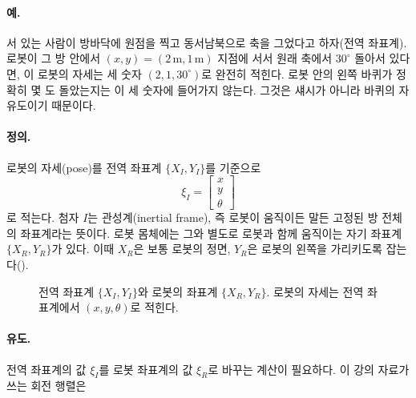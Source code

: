 \paragraph{예.} 서 있는 사람이 방바닥에 원점을 찍고 동서남북으로 축을 그었다고
하자(전역 좌표계). 로봇이 그 방 안에서 $(x,y)=(2\,\text{m}, 1\,\text{m})$
지점에 서서 원래 축에서 $30^\circ$ 돌아서 있다면, 이 로봇의 자세는 세 숫자
$(2, 1, 30^\circ)$로 완전히 적힌다. 로봇 안의 왼쪽 바퀴가 정확히 몇 도
돌았는지는 이 세 숫자에 들어가지 않는다. 그것은 섀시가 아니라 바퀴의
자유도이기 때문이다.

\paragraph{정의.} 로봇의 자세(pose)를 전역 좌표계 $\{X_I, Y_I\}$를 기준으로
\[
  \xi_I = \begin{bmatrix} x \\ y \\ \theta \end{bmatrix}
\]
로 적는다. 첨자 $I$는 관성계(inertial frame), 즉 로봇이 움직이든 말든 고정된
방 전체의 좌표계라는 뜻이다. 로봇 몸체에는 그와 별도로 로봇과 함께 움직이는
자기 좌표계 $\{X_R, Y_R\}$가 있다. 이때 $X_R$은 보통 로봇의 정면, $Y_R$은
로봇의 왼쪽을 가리키도록 잡는다().

\begin{figure}[ht]
\centering
{}
\caption{전역 좌표계 $\{X_I, Y_I\}$와 로봇의 좌표계 $\{X_R, Y_R\}$. 로봇의
         자세는 전역 좌표계에서 $(x, y, \theta)$로 적힌다.}
\label{fig:lec01-frames}
\end{figure}

\paragraph{유도.} 전역 좌표계의 값 $\xi_I$를 로봇 좌표계의 값 $\xi_R$로
바꾸는 계산이 필요하다. 이 강의 자료가 쓰는 회전 행렬은

